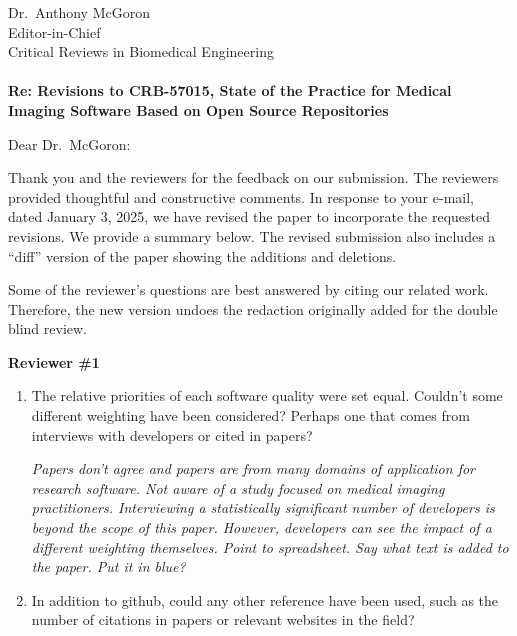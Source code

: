\documentclass[12pt]{casletter}
\begin{document}
\begin{letter}{~\\
    ~\\
    ~\\
    ~\\
    ~\\
    Dr.\ Anthony McGoron\\
    Editor-in-Chief\\
    Critical Reviews in Biomedical Engineering\\
    ~\\
    {\bf Re: Revisions to CRB-57015, State of the Practice for Medical Imaging
    Software Based on Open Source Repositories}}

  \opening {Dear Dr.\ McGoron:}

  Thank you and the reviewers for the feedback on our submission.  The reviewers
  provided thoughtful and constructive comments.  In response to your e-mail,
  dated January 3, 2025, we have revised the paper to incorporate the requested
  revisions.  We provide a summary below.  The revised submission also includes
  a ``diff'' version of the paper showing the additions and deletions.

  Some of the reviewer's questions are best answered by citing our related work.
  Therefore, the new version undoes the redaction originally added for the
  double blind review.

  \textbf{Reviewer \#1}

  \begin{enumerate}
  \item The relative priorities of each software quality were set equal.
  Couldn't some different weighting have been considered? Perhaps one that comes
  from interviews with developers or cited in papers? \medskip

  \emph{Papers don't agree and papers are from many domains of application for
  research software.  \cite{Nguyen-HoanEtAl2010}  Not aware of a study focused
  on medical imaging practitioners.  Interviewing a statistically significant
  number of developers is beyond the scope of this paper.  However, developers
  can see the impact of a different weighting themselves.  Point to spreadsheet.
  Say what text is added to the paper.  Put it in blue?  \smallskip}

  \item In addition to github, could any other reference have been used, such as
  the number of citations in papers or relevant websites in the field? \medskip


\end{enumerate}
\end{letter}
\end{document}
